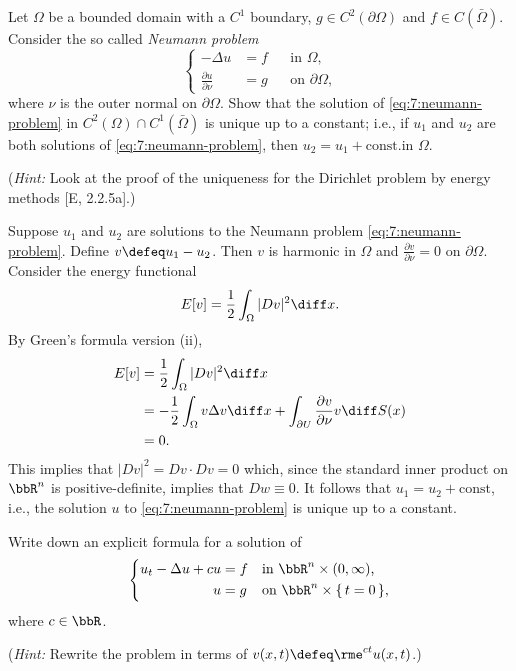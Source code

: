 \begin{problem}
  Let \(\Omega\) be a bounded domain with a \(C^1\) boundary, \(g\in
  C^2(\partial\Omega)\) and \(f\in C(\bar\Omega)\). Consider the so called
  \emph{Neumann problem}
  \[
    \label{eq:7:neumann-problem}%
    \tag{\(*\)}%
    \left\{
      \begin{aligned}
        -\Delta u&=f&&\text{in \(\Omega\),}\\
        \frac{\partial u}{\partial\nu}&=g&&\text{on \(\partial\Omega\),}
      \end{aligned}
    \right.
  \]
  where \(\nu\) is the outer normal on \(\partial\Omega\). Show that the
  solution of \eqref{eq:7:neumann-problem} in
  \(C^2(\Omega)\cap C^1(\bar\Omega)\) is unique up to a constant; i.e., if
  \(u_1\) and \(u_2\) are both solutions of \eqref{eq:7:neumann-problem},
  then \(u_2=u_1+\text{const.}\)\@ in \(\Omega\).

  \noindent (\emph{Hint:} Look at the proof of the uniqueness for the
  Dirichlet problem by energy methods [E, 2.2.5a].)
\end{problem}
\begin{solution}
  Suppose \(u_1\) and \(u_2\) are solutions to the Neumann problem
  \eqref{eq:7:neumann-problem}. Define \(v\defeq u_1-u_2\). Then \(v\) is
  harmonic in \(\Omega\) and \(\frac{\partial v}{\partial \nu}=0\) on
  \(\partial\Omega\). Consider the energy functional
  \[
    E[v]=\frac{1}{2}\int_\Omega|Dv|^2\diff x.
  \]
  By Green's formula version (ii),
  \begin{align*}
    E[v]
    &=\frac{1}{2}\int_\Omega|Dv|^2\diff x\\
    &=-\frac{1}{2}\int_\Omega v\Delta v\diff x
      +\int_{\partial U}\frac{\partial
      v}{\partial\nu} v\diff S(x)\\
    &=0.
  \end{align*}
  This implies that \(|Dv|^2=Dv\cdot Dv=0\) which, since the standard inner
  product on \(\bbR^n\) is positive-definite, implies that \(Dw\equiv
  0\). It follows that \(u_1=u_2+\text{const}\), i.e., the solution \(u\)
  to \eqref{eq:7:neumann-problem} is unique up to a constant.
\end{solution}
\newpage

\begin{problem}
  Write down an explicit formula for a solution of
  \[
    \left\{
      \begin{aligned}
        u_t-\Delta u+cu&=f&&\text{in \(\bbR^n\times(0,\infty)\),}\\
        u&=g&&\text{on \(\bbR^n\times\{\,t=0\,\}\),}
      \end{aligned}
    \right.
  \]
  where \(c\in\bbR\).

  \noindent (\emph{Hint:} Rewrite the problem in terms of
  \(v(x,t)\defeq\rme^{ct}u(x,t)\).)
\end{problem}
\begin{solution}
\end{solution}

